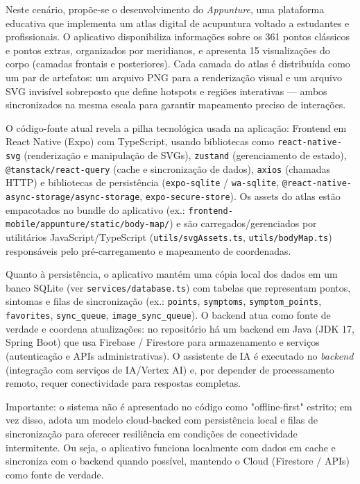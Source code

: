 Neste cenário, propõe-se o desenvolvimento do \textit{Appunture}, uma plataforma educativa que implementa um atlas digital de acupuntura voltado a estudantes e profissionais. O aplicativo disponibiliza informações sobre os 361 pontos clássicos e pontos extras, organizados por meridianos, e apresenta 15 visualizações do corpo (camadas frontais e posteriores). Cada camada do atlas é distribuída como um par de artefatos: um arquivo PNG para a renderização visual e um arquivo SVG invisível sobreposto que define hotspots e regiões interativas — ambos sincronizados na mesma escala para garantir mapeamento preciso de interações.

O código-fonte atual revela a pilha tecnológica usada na aplicação: Frontend em React Native (Expo) com TypeScript, usando bibliotecas como \texttt{react-native-svg} (renderização e manipulação de SVGs), \texttt{zustand} (gerenciamento de estado), \texttt{@tanstack/react-query} (cache e sincronização de dados), \texttt{axios} (chamadas HTTP) e bibliotecas de persistência (\texttt{expo-sqlite} / \texttt{wa-sqlite}, \texttt{@react-native-async-storage/async-storage}, \texttt{expo-secure-store}). Os assets do atlas estão empacotados no bundle do aplicativo (ex.: \texttt{frontend-mobile/appunture/static/body-map/}) e são carregados/gerenciados por utilitários JavaScript/TypeScript (\texttt{utils/svgAssets.ts}, \texttt{utils/bodyMap.ts}) responsáveis pelo pré-carregamento e mapeamento de coordenadas.

Quanto à persistência, o aplicativo mantém uma cópia local dos dados em um banco SQLite (ver \texttt{services/database.ts}) com tabelas que representam pontos, sintomas e filas de sincronização (ex.: \texttt{points}, \texttt{symptoms}, \texttt{symptom\_points}, \texttt{favorites}, \texttt{sync\_queue}, \texttt{image\_sync\_queue}). O backend atua como fonte de verdade e coordena atualizações: no repositório há um backend em Java (JDK 17, Spring Boot) que usa Firebase / Firestore para armazenamento e serviços (autenticação e APIs administrativas). O assistente de IA é executado no \textit{backend} (integração com serviços de IA/Vertex AI) e, por depender de processamento remoto, requer conectividade para respostas completas.

Importante: o sistema não é apresentado no código como "offline-first" estrito; em vez disso, adota um modelo cloud-backed com persistência local e filas de sincronização para oferecer resiliência em condições de conectividade intermitente. Ou seja, o aplicativo funciona localmente com dados em cache e sincroniza com o backend quando possível, mantendo o Cloud (Firestore / APIs) como fonte de verdade.

